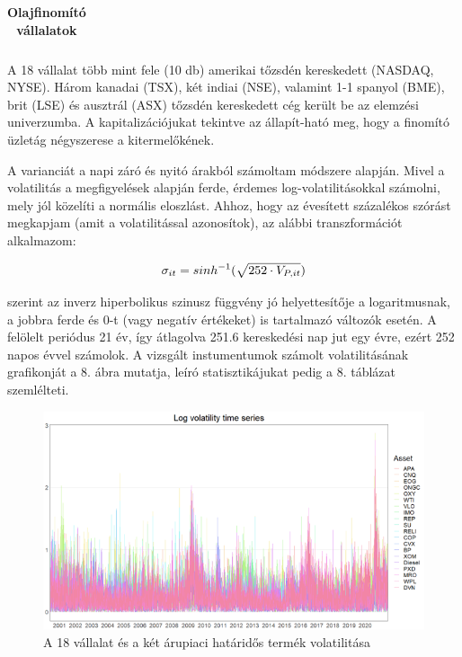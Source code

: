 \documentclass[12pt,bibliography=totoc]{article}
\begin{document}
\begin{table}[H]
\begin{subtable}[t]{0.45\textwidth}
\begin{tabular}{l lll}
\hline  
\end{tabular}
\caption{\textbf{Olajfinomító vállalatok}}
\end{subtable}

\end{table}


A 18 vállalat több mint fele (10 db) amerikai tőzsdén kereskedett (NASDAQ, NYSE). Három kanadai (TSX), két indiai (NSE), valamint 1-1 spanyol (BME), brit (LSE) és ausztrál (ASX) tőzsdén kereskedett cég került be az elemzési univerzumba. A kapitalizációjukat tekintve az állapít-ható meg, hogy a finomító üzletág négyszerese a kitermelőkének. 

A varianciát a napi záró és nyitó árakból számoltam \cite{parkinson1980extreme} módszere alapján. Mivel a volatilitás a megfigyelések alapján ferde, érdemes log-volatilitásokkal számolni, mely jól közelíti a normális eloszlást. Ahhoz, hogy az évesített százalékos szórást megkapjam (amit a volatilitással azonosítok), az alábbi transzformációt alkalmazom:

\begin{equation}
\sigma_{it}=sinh^{-1}(\sqrt{252\cdot{} V_{P,it}}) \\
\end{equation}

\cite{aihounton2019units} szerint az inverz hiperbolikus szinusz függvény jó helyettesítője a logaritmusnak, a jobbra ferde és 0-t (vagy negatív értékeket) is tartalmazó változók esetén. A felölelt periódus 21 év, így átlagolva 251.6 kereskedési nap jut egy évre, ezért 252 napos évvel számolok. A vizsgált instumentumok számolt volatilitásának grafikonját a 8. ábra mutatja, leíró statisztikájukat pedig a 8. táblázat szemlélteti.

\begin{figure}[H]
\caption{A 18 vállalat és a két árupiaci határidős termék volatilitása}
\includegraphics[width=11.5cm]{volatility}
\centering
\end{figure}
\end{document}

